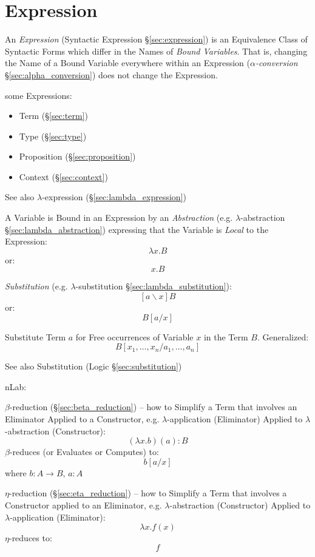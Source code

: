 \section{Expression}\label{sec:type_expression}

An \emph{Expression} (Syntactic Expression \S\ref{sec:expression}) is
an Equivalence Class of Syntactic Forms which differ in the Names of
\emph{Bound Variables}. That is, changing the Name of a Bound Variable
everywhere within an Expression (\emph{$\alpha$-conversion}
\S\ref{sec:alpha_conversion}) does not change the Expression.

some Expressions:
\begin{itemize}
  \item Term (\S\ref{sec:term})
  \item Type (\S\ref{sec:type})
  \item Proposition (\S\ref{sec:proposition})
  \item Context (\S\ref{sec:context})
\end{itemize}

\fist See also $\lambda$-expression (\S\ref{sec:lambda_expression})

A Variable is Bound in an Expression by an \emph{Abstraction} (e.g.
$\lambda$-abstraction \S\ref{sec:lambda_abstraction}) expressing that
the Variable is \emph{Local} to the Expression:
\[
  \lambda x.B
\]
or:
\[
  x.B
\]

\emph{Substitution} (e.g. $\lambda$-substitution
\S\ref{sec:lambda_substitution}):
\[
  [a \backslash x]B
\]
or:
\[
  B[a/x]
\]

Substitute Term $a$ for Free occurrences of Variable $x$ in the Term
$B$. Generalized:
\[
  B[x_1,\ldots,x_n / a_1,\ldots,a_n]
\]

\fist See also Substitution (Logic \S\ref{sec:substitution})


\asterism

nLab:

$\beta$-reduction (\S\ref{sec:beta_reduction}) -- how to Simplify a Term
that involves an Eliminator Applied to a Constructor, e.g.
$\lambda$-application (Eliminator) Applied to $\lambda$-abstraction
(Constructor):
\[
  (\lambda x.b)(a):B
\]
$\beta$-reduces (or Evaluates or Computes) to:
\[
  b[a/x]
\]
where $b : A \rightarrow B$, $a:A$

$\eta$-reduction (\S\ref{sec:eta_reduction}) -- how to Simplify a Term
that involves a Constructor applied to an Eliminator, e.g.
$\lambda$-abstraction (Constructor) Applied to $\lambda$-application
(Eliminator):
\[
  \lambda x.f(x)
\]
$\eta$-reduces to:
\[
  f
\]



